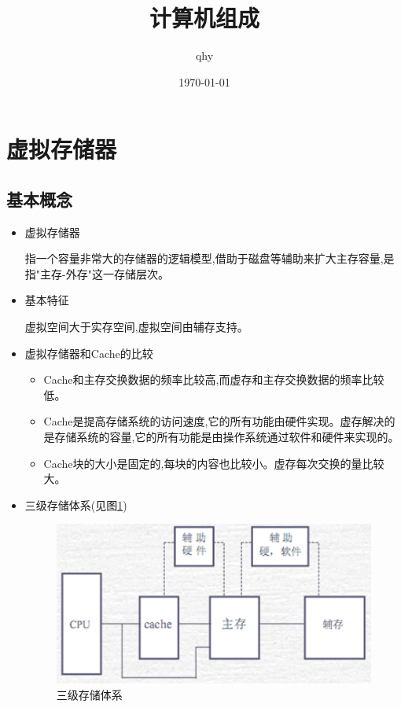 \documentclass[UTF8,a4paper]{ctexart}%
\author{qhy}%
\date{\today}%
\title{计算机组成}%
\begin{document}
  \maketitle
  \tableofcontents
  \newpage
  \section{虚拟存储器}
      \subsection{基本概念}
          \begin{itemize}
            \item 虚拟存储器

            指一个容量非常大的存储器的逻辑模型,借助于磁盘等辅助来扩大主存容量,是指"主存-外存"这一存储层次。

            \item 基本特征

            虚拟空间大于实存空间,虚拟空间由辅存支持。

            \item 虚拟存储器和Cache的比较
                \begin{itemize}
                  \item Cache和主存交换数据的频率比较高,而虚存和主存交换数据的频率比较低。

                  \item Cache是提高存储系统的访问速度,它的所有功能由硬件实现。虚存解决的是存储系统的容量,它的所有功能是由操作系统通过软件和硬件来实现的。

                  \item Cache块的大小是固定的,每块的内容也比较小。虚存每次交换的量比较大。
                \end{itemize}
            \item 三级存储体系(见图\ref{fig1})
                \begin{figure}[!htp]
                  \centering
                  \includegraphics[scale=0.8]{assets/jisuanjizucheng2_14007.png}
                  \caption{三级存储体系}
                  \label{fig1}
                \end{figure}


\end{itemize}
\end{document}
